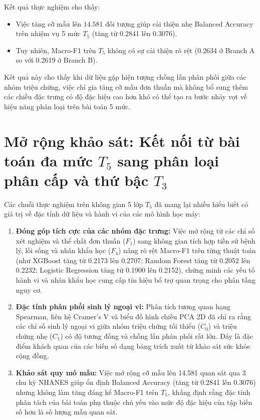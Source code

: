 Kết quả thực nghiệm cho thấy:
\begin{itemize}
    \item Việc tăng cỡ mẫu lên $14.581$ đối tượng giúp cải thiện nhẹ Balanced Accuracy trên nhiệm vụ 5 mức $T_5$ (tăng từ 0.2841 lên 0.3076).
    \item Tuy nhiên, Macro-F1 trên $T_5$ không có sự cải thiện rõ rệt (0.2634 ở Branch A so với 0.2619 ở Branch B).
\end{itemize}
Kết quả này cho thấy khi dữ liệu gặp hiện tượng chồng lấn phân phối giữa các nhóm triệu chứng, việc chỉ gia tăng cỡ mẫu đơn thuần mà không bổ sung thêm các chiều đặc trưng có độ đặc hiệu cao hơn khó có thể tạo ra bước nhảy vọt về hiệu năng phân loại trên bài toán 5 mức.

\section{Mở rộng khảo sát: Kết nối từ bài toán đa mức $T_5$ sang phân loại phân cấp và thứ bậc $T_3$}
\label{sec:chuyen-dich-t5-t3}

Các chuỗi thực nghiệm trên không gian 5 lớp $T_5$ đã mang lại nhiều hiểu biết có giá trị về đặc tính dữ liệu và hành vi của các mô hình học máy:
\begin{enumerate}
    \item \textbf{Đóng góp tích cực của các nhóm đặc trưng:} Việc mở rộng từ các chỉ số xét nghiệm và thể chất đơn thuần ($F_1$) sang không gian tích hợp tiền sử bệnh lý, lối sống và nhân khẩu học ($F_4$) nâng rõ rệt Macro-F1 trên từng thuật toán (như XGBoost tăng từ 0.2173 lên 0.2707; Random Forest tăng từ 0.2052 lên 0.2232; Logistic Regression tăng từ 0.1900 lên 0.2152), chứng minh các yếu tố hành vi và nhân khẩu học cung cấp tín hiệu bổ trợ quan trọng cho phân tầng nguy cơ.
    \item \textbf{Đặc tính phân phối sinh lý ngoại vi:} Phân tích tương quan hạng Spearman, liên hệ Cramer's V và biểu đồ hình chiếu PCA 2D đã chỉ ra rằng các chỉ số sinh lý ngoại vi giữa nhóm triệu chứng tối thiểu ($C_0$) và triệu chứng nhẹ ($C_1$) có độ tương đồng và chồng lấn phân phối rất lớn. Đây là đặc điểm khách quan của các biến số dạng bảng trích xuất từ khảo sát sức khỏe cộng đồng.
    \item \textbf{Khảo sát quy mô mẫu:} Việc mở rộng cỡ mẫu lên 14.581 quan sát qua 3 chu kỳ NHANES giúp ổn định Balanced Accuracy (tăng từ 0.2841 lên 0.3076) nhưng không làm tăng đáng kể Macro-F1 trên $T_5$, khẳng định rằng đặc tính phân tách của bài toán phụ thuộc chủ yếu vào mức độ đặc hiệu của tập biến số hơn là số lượng mẫu quan sát.
\end{enumerate}

